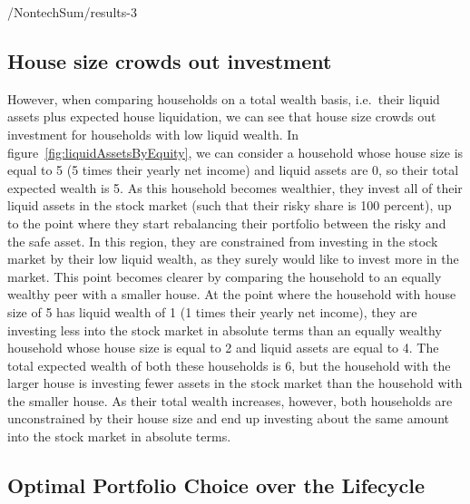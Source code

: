 \documentclass[PortfolioChoiceWithRiskyHousing]{subfiles}
\begin{document}
\begin{verbatimwrite}{\LaTeXOutput/NontechSum/results-3}

  \subsection{House size crowds out investment}

  However, when comparing households on a total wealth basis, i.e.\ their liquid assets plus expected house liquidation, we can see that house size crowds out investment for households with low liquid wealth. In figure~\ref{fig:liquidAssetsByEquity}, we can consider a household whose house size is equal to 5 (5 times their yearly net income) and liquid assets are 0, so their total expected wealth is 5. As this household becomes wealthier, they invest all of their liquid assets in the stock market (such that their risky share is 100 percent), up to the point where they start rebalancing their portfolio between the risky and the safe asset. In this region, they are constrained from investing in the stock market by their low liquid wealth, as they surely would like to invest more in the market. This point becomes clearer by comparing the household to an equally wealthy peer with a smaller house.  At the point where the household with house size of 5 has liquid wealth of 1 (1 times their yearly net income), they are investing less into the stock market in absolute terms than an equally wealthy household whose house size is equal to 2 and liquid assets are equal to 4. The total expected wealth of both these households is 6, but the household with the larger house is investing fewer assets in the stock market than the household with the smaller house. As their total wealth increases, however, both households are unconstrained by their house size and end up investing about the same amount into the stock market in absolute terms.

  \providecommand{\figName}{}
  \renewcommand{\figName}{liquidAssetsByEquity}
  \providecommand{\figFile}{}
  \renewcommand{\figFile}{\figName}

\end{verbatimwrite}


\subsection{Optimal Portfolio Choice over the Lifecycle}
\end{document}
